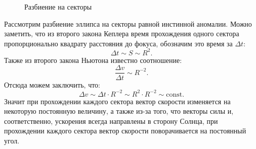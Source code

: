 \begin{wrapfigure}[11]{r}{0.55\tw}
        \caption{Разбиение на секторы}
    	\label{pic:hodograph1}    
\end{wrapfigure}
Рассмотрим разбиение эллипса на секторы равной инстинной аномалии. Можно заметить, что из второго закона Кеплера время прохождения одного сектора пропорционально квадрату расстояния до фокуса, обозначим это время за $\Delta t$:
\begin{equation*}
	\Delta t \sim S \sim R^2.
\end{equation*}
Также из второго закона Ньютона известно соотношение:
\begin{equation*}
	\frac{\Delta v}{\Delta t} \sim R^{-2}.
\end{equation*}
Отсюда можем заключить, что:
\begin{equation*}
	\Delta v \sim \Delta t \cdot R^{-2} \sim  R^2 \cdot R^{-2} \sim \text{const}.
\end{equation*}
Значит при прохождении каждого сектора вектор скорости изменяется на некоторую постоянную величину, а также из-за того, что векторы силы и, соответственно, ускорения всегда направлены в сторону Солнца, при прохождении каждого сектора вектор скорости поворачивается на постоянный угол.

